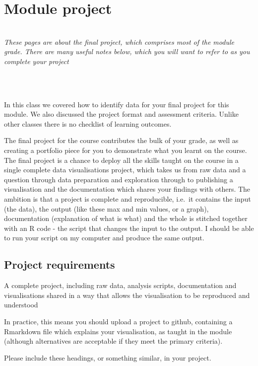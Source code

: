 \documentclass[
]{book}
\newenvironment{info}
    {
    \hline\\
    }
    { 
    \\\\\hline
    }
\begin{document}
\hypertarget{module-project}{%
\chapter*{Module project}\label{module-project}}


\begin{info}
\emph{These pages are about the final project, which comprises most of
the module grade. There are many useful notes below, which you will want
to refer to as you complete your project}
\end{info}

In this class we covered how to identify data for your final project for this module. We also discussed the project format and assessment criteria. Unlike other classes there is no checklist of learning outcomes.

The final project for the course contributes the bulk of your grade, as well as creating a portfolio piece for you to demonstrate what you learnt on the course. The final project is a chance to deploy all the skills taught on the course in a single complete data visualisations project, which takes us from raw data and a question through data preparation and exploration through to publishing a visualisation and the documentation which shares your findings with others. The ambition is that a project is complete and reproducible, i.e.~it contains the input (the data), the output (like these max and min values, or a graph), documentation (explanation of what is what) and the whole is stitched together with an R code - the script that changes the input to the output. I should be able to run your script on my computer and produce the same output.

\hypertarget{requirements}{%
\section{Project requirements}\label{requirements}}

A complete project, including raw data, analysis scripts, documentation and visualisations shared in a way that allows the visualisation to be reproduced and understood

In practice, this means you should upload a project to github, containing a Rmarkdown file which explains your visualisation, as taught in the module (although alternatives are acceptable if they meet the primary criteria).

Please include these headings, or something similar, in your project.
\end{document}
